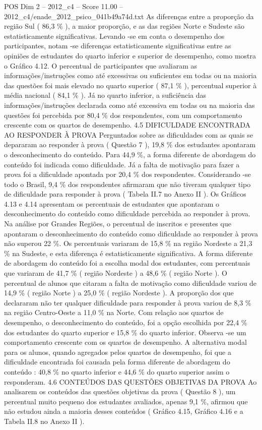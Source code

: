 \begin{textsample}{POS Dim 2 – 2012\_c4 – Score 11.00 – 2012\_c4/enade\_2012\_psico\_041b49a74d.txt}
As diferenças entre a proporção da região Sul ( 86,3 \% ), a maior proporção, e as das regiões Norte e Sudeste são estatisticamente significativas.
Levando -se em conta o desempenho dos participantes, notam -se diferenças estatisticamente significativas entre as opiniões de estudantes do quarto inferior e superior de desempenho, como mostra o Gráfico 4.12.
O percentual de participantes que avaliaram as informações/instruções como até excessivas ou suficientes em todas ou na maioria das questões foi mais elevado no quarto superior ( 87,1 \% ), percentual superior à média nacional ( 84,1 \% ).
Já no quarto inferior, a suficiência das informações/instruções declarada como até excessiva em todas ou na maioria das questões foi percebida por 80,4 \% dos respondentes, com um comportamento crescente com os quartos de desempenho. 4.5 DIFICULDADE ENCONTRADA AO RESPONDER À PROVA Perguntados sobre as dificuldades com as quais se depararam ao responder à prova ( Questão 7 ), 19,8 \% dos estudantes apontaram o desconhecimento do conteúdo.
Para 44,9 \%, a forma diferente de abordagem do conteúdo foi indicada como dificuldade.
Já a falta de motivação para fazer a prova foi a dificuldade apontada por 20,4 \% dos respondentes.
Considerando -se todo o Brasil, 9,4 \% dos respondentes afirmaram que não tiveram qualquer tipo de dificuldade para responder à prova ( Tabela II.7 no Anexo II ).
Os Gráficos 4.13 e 4.14 apresentam os percentuais de estudantes que apontaram o desconhecimento do conteúdo como dificuldade percebida ao responder à prova.
Na análise por Grandes Regiões, o percentual de inscritos e presentes que apontaram o desconhecimento do conteúdo como dificuldade ao responder à prova não superou 22 \%.
Os percentuais variaram de 15,8 \% na região Nordeste a 21,3 \% na Sudeste, e esta diferença é estatisticamente significativa.
A forma diferente de abordagem do conteúdo foi a escolha modal dos estudantes, com percentuais que variaram de 41,7 \% ( região Nordeste ) a 48,6 \% ( região Norte ).
O percentual de alunos que citaram a falta de motivação como dificuldade variou de 14,9 \% ( região Norte ) a 25,0 \% ( região Nordeste ).
A proporção dos que declararam não ter qualquer dificuldade para responder à prova variou de 8,3 \% na região Centro-Oeste a 11,0 \% na Norte.
Com relação aos quartos de desempenho, o desconhecimento do conteúdo, foi a opção escolhida por 22,4 \% dos estudantes do quarto superior e 15,8 \% do quarto inferior.
Observa -se um comportamento crescente com os quartos de desempenho.
A alternativa modal para os alunos, quando agregados pelos quartos de desempenho, foi que a dificuldade encontrada foi causada pela forma diferente de abordagem do conteúdo : 40,8 \% no quarto inferior e 44,6 \% do quarto superior assim o responderam. 4.6 CONTEÚDOS DAS QUESTÕES OBJETIVAS DA PROVA Ao analisarem os conteúdos das questões objetivas da prova ( Questão 8 ), um percentual muito pequeno dos estudantes avaliados, apenas 9,1 \%, afirmou que não estudou ainda a maioria desses conteúdos ( Gráfico 4.15, Gráfico 4.16 e a Tabela II.8 no Anexo II ).

\end{textsample}
